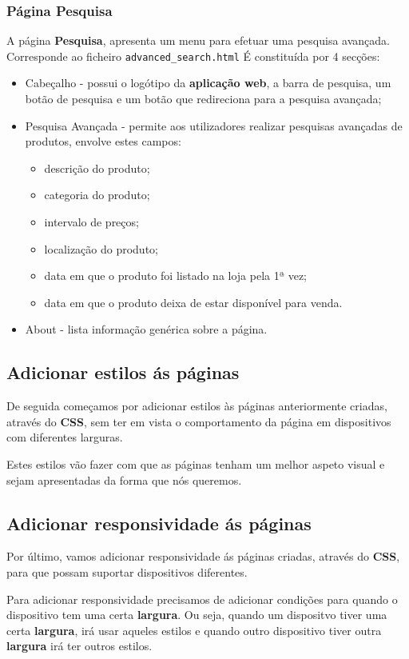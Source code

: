 \documentclass[11pt]{article}   %
\begin{document}
\subsubsection{Página Pesquisa}

A página \textbf{Pesquisa}, apresenta um menu para efetuar uma pesquisa avançada.
Corresponde ao ficheiro \verb|advanced_search.html|
É constituída por 4 secções:
\begin{itemize}
    \item Cabeçalho - possui o logótipo da \textbf{aplicação web}, a barra de pesquisa, um botão de pesquisa e um botão que redireciona para a pesquisa avançada;
    \item Pesquisa Avançada - permite aos utilizadores realizar pesquisas avançadas de produtos, envolve estes campos:
        \begin{itemize}
            \item descrição do produto;
            \item categoria do produto;
            \item intervalo de preços;
            \item localização do produto;
            \item data em que o produto foi listado na loja pela 1ª vez;
            \item data em que o produto deixa de estar disponível para venda.
        \end{itemize}
    \item About - lista informação genérica sobre a página.
\end{itemize}

\subsection{Adicionar estilos ás páginas}
De seguida começamos por adicionar estilos às páginas anteriormente criadas, através do \textbf{CSS},
sem ter em vista o comportamento da página em dispositivos com diferentes larguras.\par


Estes estilos vão fazer com que as páginas tenham um melhor aspeto visual e sejam apresentadas
da forma que nós queremos.

\subsection{Adicionar responsividade ás páginas}

Por último, vamos adicionar responsividade ás páginas criadas, através do \textbf{CSS}, 
para que possam suportar dispositivos diferentes. \par
Para adicionar responsividade precisamos de adicionar condições para quando o dispositivo
tem uma certa \textbf{largura}. Ou seja, quando um dispositvo tiver uma certa \textbf{largura}, irá
usar aqueles estilos e quando outro dispositivo tiver outra \textbf{largura} irá ter outros estilos.
\end{document}
